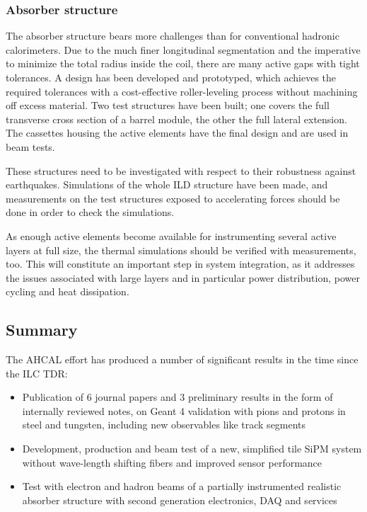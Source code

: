 \subsubsection{Absorber structure}

The absorber structure bears more challenges than for conventional hadronic calorimeters. Due to the much finer longitudinal segmentation and the imperative to minimize the total radius inside the coil, there are many active gaps with tight tolerances. A design has been developed and prototyped, which achieves the required tolerances with a cost-effective roller-leveling process without machining off excess material. Two test structures have been built; one covers the full transverse cross section of a barrel module, the other the full lateral extension. The cassettes housing the active elements have the final design and are used in beam tests.

These structures need to be investigated with respect to their robustness against earthquakes. Simulations of the whole ILD structure have been made, and measurements on the test structures exposed to accelerating forces should be done in order to check the simulations.

As enough active elements become available for instrumenting several active layers at full size, the thermal simulations should be verified with measurements, too. This will constitute an important step in system integration, as it addresses the issues associated with large layers and in particular power distribution, power cycling and heat dissipation.

\subsection{Summary}
The AHCAL effort has produced a number of significant results in the time since the ILC TDR:
\begin{itemize}
\item Publication of 6 journal papers and 3 preliminary results in the form of internally reviewed notes, on Geant 4 validation with pions and protons in steel and tungsten, including new observables like track segments
\item Development, production and beam test of a new, simplified tile SiPM system without wave-length shifting fibers and improved sensor performance
\item Test with electron and hadron beams of a partially instrumented realistic absorber structure  with second generation electronics, DAQ and services
\end{itemize}

